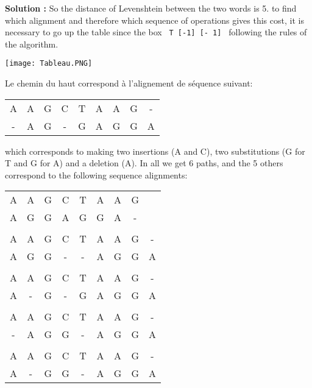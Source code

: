 \documentclass[11pt]{article} %
\newenvironment{solution}[1][\unskip]{%
	\par
	\noindent
	\textbf{Solution #1:}
	\noindent}
{\medskip}
\begin{document}
\begin{solution}
		So the distance of Levenshtein between the two words is 5. to find which alignment and therefore which sequence of operations gives this cost, it is necessary to go up the table since the box \verb | T [-1] [- 1] | following the rules of the algorithm.
		\begin{center}
			\texttt{[image: Tableau.PNG]}
		\end{center}
		Le chemin du haut correspond à l'alignement de séquence suivant:
		\begin{center}
			\begin{tabular}{ccccccccc}
				A&A&G&C&T&A&A&G&-\\
				-&A&G&-&G&A&G&G&A
			\end{tabular}
		\end{center}
		which corresponds to making two insertions (A and C), two substitutions (G for T and G for A) and a deletion (A). In all we get 6 paths, and the 5 others correspond to the following sequence alignments:
		\begin{center}
			\begin{tabular}{ccccccccc}
				A&A&G&C&T&A&A&G&\\
				A&G&G&A&G&G&A&-&\\
				\\
				A&A&G&C&T&A&A&G&-\\
				A&G&G&-&-&A&G&G&A\\
				\\
				A&A&G&C&T&A&A&G&-\\
				A&-&G&-&G&A&G&G&A\\
				\\
				A&A&G&C&T&A&A&G&-\\
				-&A&G&G&-&A&G&G&A\\
				\\
				A&A&G&C&T&A&A&G&-\\
				A&-&G&G&-&A&G&G&A\\
			\end{tabular}
		\end{center}
	\end{solution}
\end{document}
